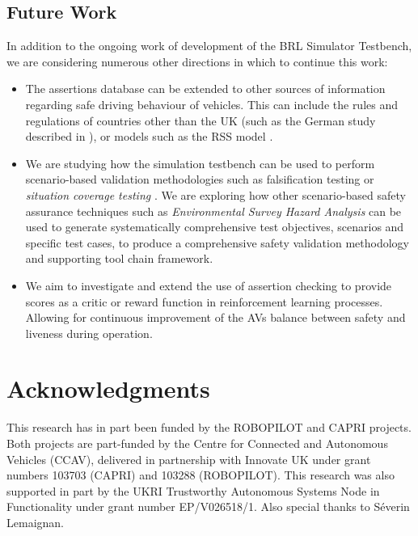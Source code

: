 \subsection{Future Work}\label{future_work}
In addition to the ongoing work of development of the BRL Simulator Testbench, we are considering numerous other directions in which to continue this work:
\begin{itemize}
    \item The assertions database can be extended to other sources of information regarding safe driving behaviour of vehicles. This can include the rules and regulations of countries other than the UK (such as the German study described in \cite{acountability}), or models such as the RSS model \cite{RSS_Shalev_Shwartz2017,RSS2_Koopman2019}.
    
    \item We are studying how the simulation testbench can be used to perform scenario-based validation methodologies such as falsification testing \cite{corso2020survey, akazaki2017causality} or \emph{situation coverage testing} \cite{alexander2015}. We are exploring how other scenario-based safety assurance techniques such as \emph{Environmental Survey Hazard Analysis}  \cite{harper2021towards} can be used to generate systematically comprehensive test objectives, scenarios and specific test cases, to produce a comprehensive safety validation methodology and supporting tool chain framework.
    
    \item We aim to investigate and extend  the use of assertion checking to provide scores as a critic or reward function in reinforcement learning processes. Allowing for continuous improvement of the AVs balance between safety and liveness during operation.
    \end{itemize}

\section{Acknowledgments}
This research has in part been funded by the ROBOPILOT and CAPRI projects. Both projects are part-funded by the Centre for Connected and Autonomous Vehicles (CCAV), delivered in partnership with Innovate UK under grant numbers 103703 (CAPRI) and 103288 (ROBOPILOT). This research was also supported in part by the UKRI Trustworthy Autonomous Systems Node in Functionality under grant number EP/V026518/1. Also special thanks to S\'everin Lemaignan.
